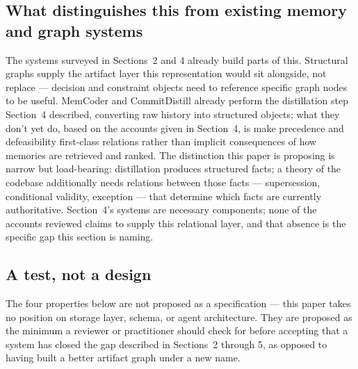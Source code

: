 \documentclass[11pt]{article}
\begin{document}
\subsection{What distinguishes this from existing memory and graph systems}

The systems surveyed in Sections~2 and 4 already build parts of this. Structural graphs supply the artifact layer this representation would sit alongside, not replace --- decision and constraint objects need to reference specific graph nodes to be useful. MemCoder and CommitDistill already perform the distillation step Section~4 described, converting raw history into structured objects; what they don't yet do, based on the accounts given in Section~4, is make precedence and defeasibility first-class relations rather than implicit consequences of how memories are retrieved and ranked. The distinction this paper is proposing is narrow but load-bearing: distillation produces structured facts; a theory of the codebase additionally needs relations between those facts --- supersession, conditional validity, exception --- that determine which facts are currently authoritative. Section~4's systems are necessary components; none of the accounts reviewed claims to supply this relational layer, and that absence is the specific gap this section is naming.

\subsection{A test, not a design}

The four properties below are not proposed as a specification --- this paper takes no position on storage layer, schema, or agent architecture. They are proposed as the minimum a reviewer or practitioner should check for before accepting that a system has closed the gap described in Sections~2 through 5, as opposed to having built a better artifact graph under a new name.
\end{document}
